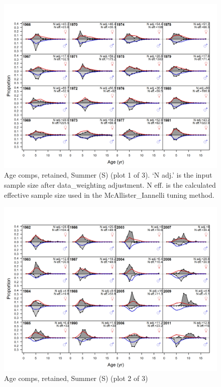 \documentclass[12pt,]{article}
\begin{document}
\begin{figure}
\centering
\includegraphics{r4ss/plots_mod1/comp_agefit_flt4mkt2_page1.png}
\caption{Age comps, retained, Summer (S) (plot 1 of 3). `N adj.' is the
input sample size after data\_weighting adjustment. N eff. is the
calculated effective sample size used in the McAllister\_Iannelli tuning
method. \label{fig:age_fits}}
\end{figure}

\begin{figure}
\centering
\includegraphics{r4ss/plots_mod1/comp_agefit_flt4mkt2_page2.png}
\caption{Age comps, retained, Summer (S) (plot 2 of 3)
\label{fig:age_fits}}
\end{figure}
\end{document}
